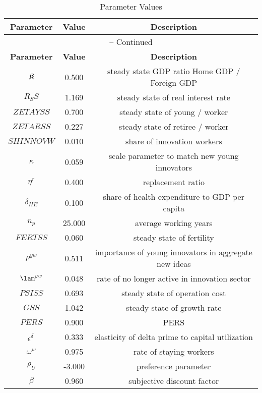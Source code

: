 \begin{center}
\begin{longtable}{ccc}
\caption{Parameter Values}\\%
\toprule%
\multicolumn{1}{c}{\textbf{Parameter}} &
\multicolumn{1}{c}{\textbf{Value}} &
 \multicolumn{1}{c}{\textbf{Description}}\\%
\midrule%
\endfirsthead
\multicolumn{3}{c}{{\tablename} \thetable{} -- Continued}\\%
\midrule%
\multicolumn{1}{c}{\textbf{Parameter}} &
\multicolumn{1}{c}{\textbf{Value}} &
  \multicolumn{1}{c}{\textbf{Description}}\\%
\midrule%
\endhead
${\mathfrak{K}}$ 	 & 	 0.500 	 & 	 steady state GDP ratio \: Home GDP / Foreign GDP \\
${R_SS}$ 	 & 	 1.169 	 & 	 steady state of real interest rate\\
${ZETAYSS}$ 	 & 	 0.700 	 & 	 steady state of young / worker \\
${ZETARSS}$ 	 & 	 0.227 	 & 	 steady state of retiree / worker \\
${SHINNOVW}$ 	 & 	 0.010 	 & 	 share of innovation workers\\
${\kappa}$ 	 & 	 0.059 	 & 	 scale parameter to match new young innovators\\
${\eta^r}$ 	 & 	 0.400 	 & 	 replacement ratio\\
${\delta_{HE}}$ 	 & 	 0.100 	 & 	 share of health expenditure to GDP per capita\\
${n_p}$ 	 & 	 25.000 	 & 	 average working years\\
${FERTSS}$ 	 & 	 0.060 	 & 	 steady state of fertility\\
${\rho^{yw}}$ 	 & 	 0.511 	 & 	 importance of young innovators in aggregate new ideas\\
${\lam^{yw}}$ 	 & 	 0.048 	 & 	 rate of no longer active in innovation sector\\
${PSISS}$ 	 & 	 0.693 	 & 	 steady state of operation cost\\
${GSS}$ 	 & 	 1.042 	 & 	 steady state of growth rate\\
$PERS$ 	 & 	 0.900 	 & 	 PERS\\
${\epsilon^{\delta^{\prime}}}$ 	 & 	 0.333 	 & 	 elasticity of delta prime to capital utilization\\
${\omega^w}$ 	 & 	 0.975 	 & 	 rate of staying workers\\
${\rho_U}$ 	 & 	 -3.000 	 & 	 preference parameter\\
${\beta}$ 	 & 	 0.960 	 & 	 subjective discount factor\\

\end{longtable}
\end{center}
